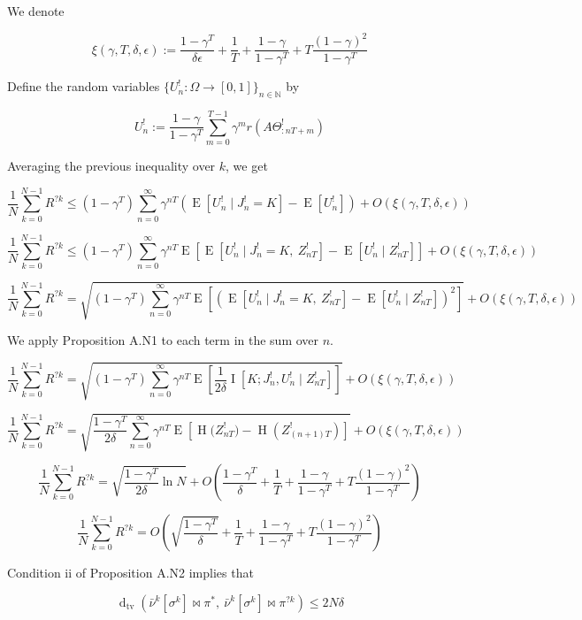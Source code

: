 \documentclass[a4paper]{article}
\newcommand{\E}[1]{\underset{#1}{\operatorname{E}}}
\newcommand{\I}[1]{\underset{#1}{\operatorname{I}}}
\newcommand{\Ent}{\operatorname{H}}
\newcommand{\Dtv}{\operatorname{d}_{\text{tv}}}
\newcommand{\Nats}{\mathbb{N}}
\newcommand{\Sq}[2]{\{#1\}_{#2 \in \Nats}}
\newcommand{\Sqn}[1]{\Sq{#1}{n}}
\newcommand{\J}{J}
\begin{document}
We denote

$$\xi(\gamma,T,\delta,\epsilon):=\frac{1-\gamma^T}{\delta\epsilon}+\frac{1}{T}+\frac{1-\gamma}{1-\gamma^T}+T\frac{(1-\gamma)^2}{1-\gamma^T}$$

Define the random variables $\Sqn{U^!_n : \Omega \rightarrow [0,1]}$ by 

$$U^!_n:=\frac{1-\gamma}{1-\gamma^T}\sum_{m=0}^{T-1} \gamma^{m} r\left(A\Theta^!_{:nT+m}\right)$$

Averaging the previous inequality over $k$, we get

$$\frac{1}{N}\sum_{k=0}^{N-1}R^{?k} \leq (1-\gamma^T)\sum_{n=0}^\infty \gamma^{nT} \left(\E{}\left[U^!_n \mid \J^!_n = K\right]-\E{}\left[U^!_n\right]\right) + O\left(\xi(\gamma,T,\delta,\epsilon)\right)$$

$$\frac{1}{N}\sum_{k=0}^{N-1}R^{?k} \leq (1-\gamma^T)\sum_{n=0}^\infty \gamma^{nT} \E{}\left[\E{}\left[U^!_n \mid \J^!_n = K,\ Z^!_{nT}\right]-\E{}\left[U^!_n \mid Z^!_{nT}\right]\right] + O\left(\xi(\gamma,T,\delta,\epsilon)\right)$$

$$\frac{1}{N}\sum_{k=0}^{N-1}R^{?k} = \sqrt{(1-\gamma^T)\sum_{n=0}^\infty \gamma^{nT} \E{}\left[\left(\E{}\left[U^!_n \mid \J^!_n = K,\ Z^!_{nT}\right]-\E{}\left[U^!_n \mid Z^!_{nT}\right]\right)^2\right]} + O\left(\xi(\gamma,T,\delta,\epsilon)\right)$$

We apply Proposition A.N1 to each term in the sum over $n$.

$$\frac{1}{N}\sum_{k=0}^{N-1}R^{?k} = \sqrt{(1-\gamma^T)\sum_{n=0}^\infty \gamma^{nT} \E{}\left[\frac{1}{2\delta}\I{}\left[K;\J^!_n,U^!_n \mid Z^!_{nT}\right]\right]} + O\left(\xi(\gamma,T,\delta,\epsilon)\right)$$

$$\frac{1}{N}\sum_{k=0}^{N-1}R^{?k} = \sqrt{\frac{1-\gamma^T}{2\delta}\sum_{n=0}^\infty \gamma^{nT} \E{}\left[\Ent\Big(Z^!_{nT}\Big)-\Ent\left(Z^!_{(n+1)T}\right)\right]} + O\left(\xi(\gamma,T,\delta,\epsilon)\right)$$

$$\frac{1}{N}\sum_{k=0}^{N-1}R^{?k} = \sqrt{\frac{1-\gamma^T}{2\delta}\ln N} + O\left(\frac{1-\gamma^T}{\delta}+\frac{1}{T}+\frac{1-\gamma}{1-\gamma^T}+T\frac{(1-\gamma)^2}{1-\gamma^T}\right)$$

$$\frac{1}{N}\sum_{k=0}^{N-1}R^{?k} = O\left(\sqrt{\frac{1-\gamma^T}{\delta}} + \frac{1}{T}+\frac{1-\gamma}{1-\gamma^T}+T\frac{(1-\gamma)^2}{1-\gamma^T}\right)$$

Condition ii of Proposition A.N2 implies that

$$\Dtv\left(\bar{\nu}^k\left[\sigma^k\right]\bowtie\pi^*,\ \bar{\nu}^k\left[\sigma^k\right]\bowtie\pi^{?k}\right) \leq 2N\delta$$
\end{document}
